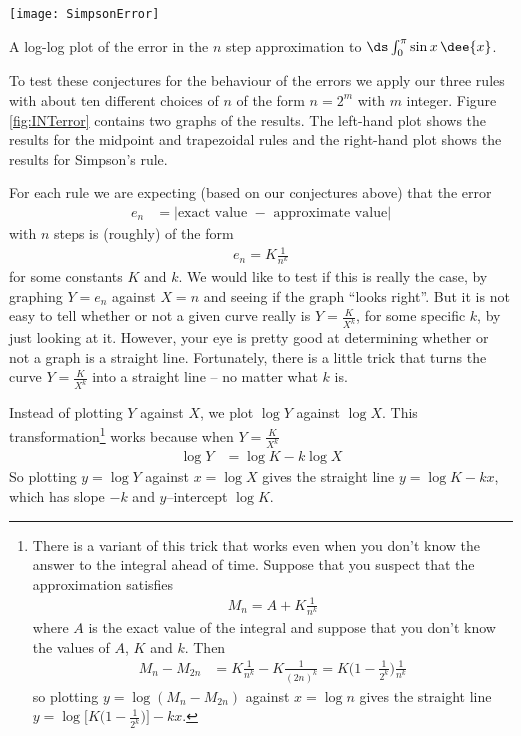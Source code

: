 \begin{fig}\label{fig:INTerror}
\begin{center}
  \quad
  \texttt{[image: SimpsonError]}
\end{center}
A log-log plot of the error in the $n$ step approximation to $\ds \int_0^\pi \sin
x\,\dee{x}$.
\end{fig}

To test these conjectures for the behaviour of the errors we apply our three rules with
about ten different choices of $n$ of the form $n=2^m $ with $m$ integer.
Figure \ref{fig:INTerror} contains two graphs of the results. The left-hand plot
shows the results for the midpoint and trapezoidal rules and the right-hand plot shows
the results for Simpson's rule.

For each rule we are expecting (based on our conjectures above) that the error
\begin{align*}
  e_n &= | \text{exact value } - \text{ approximate value}|
\end{align*}
with $n$ steps is (roughly) of the form
\begin{align*}
e_n=K\frac{1}{n^k}
\end{align*}
for some constants $K$ and $k$. We would like to test if this is really the case, by
graphing $Y=e_n$ against $X=n$ and seeing if the graph ``looks right''.
But it is not easy to tell whether or not a given curve really
is $Y=\frac{K}{X^k}$, for some specific $k$, by just looking at it. However, your eye is
pretty good at determining whether or not a graph is a straight line. Fortunately, there
is a little trick that turns the curve $Y=\tfrac{K}{X^k}$ into a straight line -- no
matter what $k$ is.

Instead of plotting $Y$ against $X$, we plot $\log Y$ against $\log X$. This
transformation\footnote{There is a variant of this trick that works even when you don't
know the answer to the integral ahead of time. Suppose that you suspect that the
approximation satisfies
\begin{align*}
M_n=A+K\tfrac{1}{n^k}
\end{align*}
where $A$ is the exact value of the integral and suppose that you
don't know the values of $A$, $K$ and $k$. Then
\begin{align*}
M_{n}-M_{2n}
&=K\tfrac{1}{n^k}-K\tfrac{1}{(2n)^k}
=K\big(1-\tfrac{1}{2^k}\big)\tfrac{1}{n^k}
\end{align*}
so plotting $y=\log(M_{n}-M_{2n})$ against $x=\log n$ gives the straight
line $y=\log \big[K\big(1-\frac{1}{2^k}\big)\big] -kx$.} works because when
$Y=\frac{K}{X^k}$
\begin{align*}
  \log Y &= \log K - k \log X
\end{align*}
So plotting $y=\log Y$ against $x=\log X$ gives the straight line $y=\log K -kx$, which
has slope $-k$ and $y$--intercept $\log K$.

